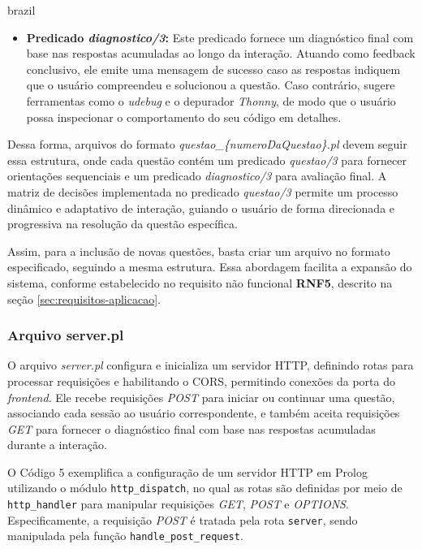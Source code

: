 \begin{otherlanguage*}{brazil}
\begin{itemize}
    \item \textbf{Predicado \textit{diagnostico/3}:} Este predicado fornece um diagnóstico final com base nas respostas acumuladas ao longo da interação. Atuando como feedback conclusivo, ele emite uma mensagem de sucesso caso as respostas indiquem que o usuário compreendeu e solucionou a questão. Caso contrário, sugere ferramentas como o \textit{udebug} e o depurador \textit{Thonny}, de modo que o usuário possa inspecionar o comportamento do seu código em detalhes.
\end{itemize}

Dessa forma, arquivos do formato \textit{questao\_\{numeroDaQuestao\}.pl} devem seguir essa estrutura, onde cada questão contém um predicado \textit{questao/3} para fornecer orientações sequenciais e um predicado \textit{diagnostico/3} para avaliação final. A matriz de decisões implementada no predicado \textit{questao/3} permite um processo dinâmico e adaptativo de interação, guiando o usuário de forma direcionada e progressiva na resolução da questão específica.

Assim, para a inclusão de novas questões, basta criar um arquivo no formato especificado, seguindo a mesma estrutura.  Essa abordagem facilita a expansão do sistema, conforme estabelecido no requisito não funcional \textbf{RNF5}, descrito na seção \ref{sec:requisitos-aplicacao}.

\subsubsection{Arquivo server.pl}


O arquivo \textit{server.pl} configura e inicializa um servidor HTTP, definindo rotas para processar requisições e habilitando o CORS, permitindo conexões da porta do \textit{frontend}. Ele recebe requisições \textit{POST} para iniciar ou continuar uma questão, associando cada sessão ao usuário correspondente, e também aceita requisições \textit{GET} para fornecer o diagnóstico final com base nas respostas acumuladas durante a interação.

O Código 5 exemplifica a configuração de um servidor HTTP em Prolog utilizando o módulo \texttt{http\_dispatch}, no qual as rotas são definidas por meio de \texttt{http\_handler} para manipular requisições \textit{GET}, \textit{POST} e \textit{OPTIONS}. Especificamente, a requisição \textit{POST} é tratada pela rota \texttt{server}, sendo manipulada pela função \texttt{handle\_post\_request}.


\end{otherlanguage*}
